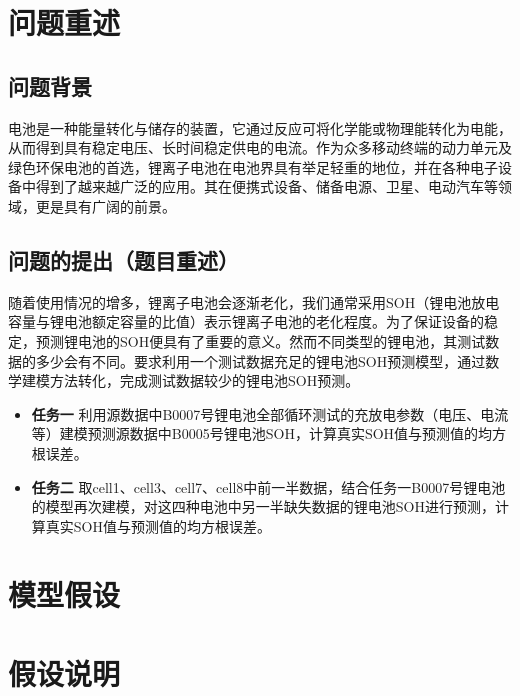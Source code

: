 \documentclass{cumcm}
\title{}
\begin{document}
 

\begin{minipage}{0.9\textwidth}
\centering\LARGE\textbf{}
\end{minipage}
\begin{abstract}

\end{abstract}

\newpage
\section{问题重述}
\subsection{问题背景}
电池是一种能量转化与储存的装置，它通过反应可将化学能或物理能转化为电能，从而得到具有稳定电压、长时间稳定供电的电流。作为众多移动终端的动力单元及绿色环保电池的首选，锂离子电池在电池界具有举足轻重的地位，并在各种电子设备中得到了越来越广泛的应用。其在便携式设备、储备电源、卫星、电动汽车等领域，更是具有广阔的前景。
\subsection{问题的提出（题目重述）}
随着使用情况的增多，锂离子电池会逐渐老化，我们通常采用SOH（锂电池放电容量与锂电池额定容量的比值）表示锂离子电池的老化程度。为了保证设备的稳定，预测锂电池的SOH便具有了重要的意义。然而不同类型的锂电池，其测试数据的多少会有不同。要求利用一个测试数据充足的锂电池SOH预测模型，通过数学建模方法转化，完成测试数据较少的锂电池SOH预测。

\begin{itemize}
\item \textbf{任务一} \quad 利用源数据中B0007号锂电池全部循环测试的充放电参数（电压、电流等）建模预测源数据中B0005号锂电池SOH，计算真实SOH值与预测值的均方根误差。
\item \textbf{任务二} \quad 取cell1、cell3、cell7、cell8中前一半数据，结合任务一B0007号锂电池的模型再次建模，对这四种电池中另一半缺失数据的锂电池SOH进行预测，计算真实SOH值与预测值的均方根误差。
\end{itemize}

\section{模型假设}

\section{假设说明}
\end{document}
